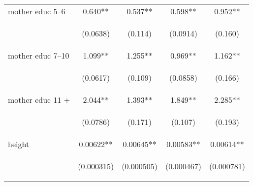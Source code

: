 \documentclass[]{article}
\begin{document}
\begin{center}
\begin{tabular}{lcccc}
mother educ 5--6 & 0.640** & 0.537** & 0.598** & 0.952** \\
\vspace{4pt} & \begin{footnotesize}(0.0638)\end{footnotesize} & \begin{footnotesize}(0.114)\end{footnotesize} & \begin{footnotesize}(0.0914)\end{footnotesize} & \begin{footnotesize}(0.160)\end{footnotesize} \\
mother educ 7--10 & 1.099** & 1.255** & 0.969** & 1.162** \\
\vspace{4pt} & \begin{footnotesize}(0.0617)\end{footnotesize} & \begin{footnotesize}(0.109)\end{footnotesize} & \begin{footnotesize}(0.0858)\end{footnotesize} & \begin{footnotesize}(0.166)\end{footnotesize} \\
mother educ 11 + & 2.044** & 1.393** & 1.849** & 2.285** \\
\vspace{4pt} & \begin{footnotesize}(0.0786)\end{footnotesize} & \begin{footnotesize}(0.171)\end{footnotesize} & \begin{footnotesize}(0.107)\end{footnotesize} & \begin{footnotesize}(0.193)\end{footnotesize} \\
height & 0.00622** & 0.00645** & 0.00583** & 0.00614** \\
\vspace{4pt} & \begin{footnotesize}(0.000315)\end{footnotesize} & \begin{footnotesize}(0.000505)\end{footnotesize} & \begin{footnotesize}(0.000467)\end{footnotesize} & \begin{footnotesize}(0.000781)\end{footnotesize} \\

\end{tabular}
\end{center}
\end{document}
